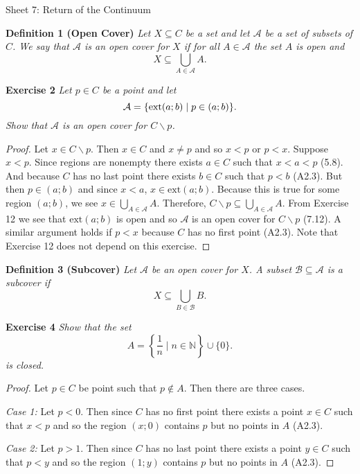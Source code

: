 \documentclass{article}
\begin{document}
\begin{flushleft}
\Large

Sheet 7: Return of the Continuum\newline

\normalsize

\textbf{Definition 1 (Open Cover)}
\textsl{Let $X \subseteq C$ be a set and let $\mathcal{A}$ be a set of subsets of $C$. We say that $\mathcal{A}$ is an open cover for $X$ if for all $A \in \mathcal{A}$ the set $A$ is open and
\[
X \subseteq \bigcup_{A \in \mathcal{A}} A.
\]}\newline

\textbf{Exercise 2}
\textsl{Let $p \in C$ be a point and let
\[
\mathcal{A} = \{\textup{ext}(a;b) \mid p \in (a;b)\}.
\]
Show that $\mathcal{A}$ is an open cover for $C \backslash p$.}
\begin{proof}
Let $x \in C \backslash p$. Then $x \in C$ and $x \neq p$ and so $x<p$ or $p<x$. Suppose $x<p$. Since regions are nonempty there exists $a \in C$ such that $x<a<p$ (5.8). And because $C$ has no last point there exists $b \in C$ such that $p<b$ (A2.3). But then $p \in (a;b)$ and since $x < a$, $x \in \text{ext}(a;b)$. Because this is true for some region $(a;b)$, we see $x \in \bigcup_{A \in \mathcal{A}} A$. Therefore, $C \backslash p \subseteq \bigcup_{A \in \mathcal{A}} A$. From Exercise 12 we see that $\text{ext}(a;b)$ is open and so $\mathcal{A}$ is an open cover for $C \backslash p$ (7.12). A similar argument holds if $p < x$ because $C$ has no first point (A2.3). Note that Exercise 12 does not depend on this exercise.
\end{proof}

\textbf{Definition 3 (Subcover)}
\textsl{Let $\mathcal{A}$ be an open cover for $X$. A subset $\mathcal{B} \subseteq \mathcal{A}$ is a subcover if
\[
X \subseteq \bigcup_{B \in \mathcal{B}} B.
\]}\newline

\textbf{Exercise 4}
\textsl{Show that the set
\[
A = \left\{ \frac{1}{n} \mid n \in \mathbb{N} \right\} \cup \{0\}.
\]
is closed.}
\begin{proof}
Let $p \in C$ be point such that $p \notin A$. Then there are three cases.\newline

\textit{Case 1:} Let $p<0$. Then since $C$ has no first point there exists a point $x \in C$ such that $x<p$ and so the region $(x;0)$ contains $p$ but no points in $A$ (A2.3).\newline

\textit{Case 2:} Let $p>1$. Then since $C$ has no last point there exists a point $y \in C$ such that $p<y$ and so the region $(1;y)$ contains $p$ but no points in $A$ (A2.3).\newline


\end{proof}
\end{flushleft}
\end{document}
